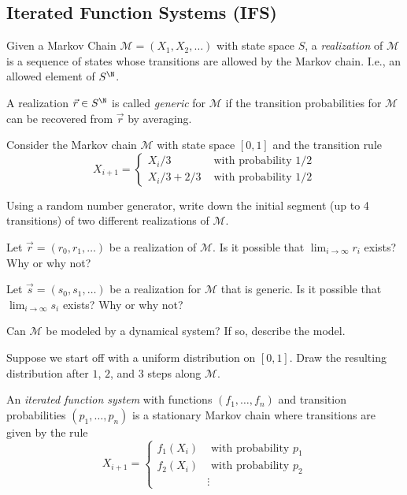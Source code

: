 	\newpage
	\subsection*{Iterated Function Systems (IFS)}

	\begin{definition}
		Given a Markov Chain $\mathcal M = (X_1,X_2,\ldots)$ with state space $S$, a \emph{realization} 
		of $\mathcal M$ is a sequence of states whose transitions are allowed by the Markov chain. I.e.,
		an allowed element of $S^{\N}$.

		A realization $\vec r\in S^{\N}$ is called \emph{generic} for $\mathcal M$
		if the transition probabilities for $\mathcal M$ can be recovered from $\vec r$ by
		averaging.
	\end{definition}
	
	\question
	Consider the Markov chain $\mathcal M$ with state space $[0,1]$ and the transition rule
	\[
		X_{i+1} =\begin{cases}
			X_i/3 &\text{ with probability $1/2$}\\
			X_i/3 + 2/3 &\text{ with probability $1/2$}
		\end{cases}
	\]
	\begin{parts}
		\item Using a random number generator, write down the initial segment (up to 4 transitions) of two
		different realizations of $\mathcal M$.
		\item Let $\vec r=(r_0,r_1,\ldots)$ be a realization of $\mathcal M$. Is it possible that
			$\lim_{i\to\infty} r_i$ exists? Why or why not?
		\item Let $\vec s=(s_0,s_1,\ldots)$ be a realization for $\mathcal M$ that is generic. 
			Is it possible that
			$\lim_{i\to\infty} s_i$ exists? Why or why not?
		\item Can $\mathcal M$ be modeled by a dynamical system? If so, describe the model.
		\item Suppose we start off with a uniform distribution on $[0,1]$. Draw the
			resulting distribution after $1$, $2$, and $3$ steps along $\mathcal M$. 
	\end{parts}

	\newpage
	\begin{definition}
		An \emph{iterated function system} with functions $(f_1,\ldots,f_n)$
		and transition probabilities $(p_1,\ldots,p_n)$ 
		is a stationary Markov chain where transitions are given by the rule
		\[
			X_{i+1} =
			\begin{cases}
				f_1(X_i) &\text{ with probability $p_1$}\\
				f_2(X_i) &\text{ with probability $p_2$}\\
				& \vdots 
			\end{cases}
		\]
	\end{definition}

